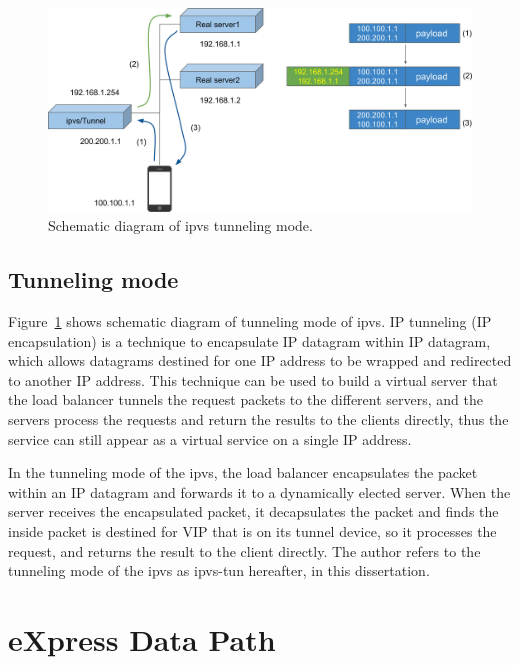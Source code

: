 \begin{figure}[h]
  \centering
  \includegraphics[width=0.9\columnwidth]{Figs/ipvs-tun-schem}

  \par\bigskip
  \centering
  \begin{minipage}{0.9\columnwidth}
    \caption[ipvs tunneling  mode]{
      Schematic diagram of ipvs tunneling mode.
    }
    \label{fig:ipvs-tun-schem}
  \end{minipage}
\end{figure}

\subsection{Tunneling mode}

Figure~\ref{fig:ipvs-tun-schem} shows schematic diagram of tunneling mode of ipvs.
IP tunneling (IP encapsulation) is a technique to encapsulate IP datagram within IP datagram, which allows datagrams destined for one IP address to be wrapped and redirected to another IP address. This technique can be used to build a virtual server that the load balancer tunnels the request packets to the different servers, and the
servers process the requests and return the results to the clients directly, thus the service can still appear as a virtual service on a single IP address.

In the tunneling mode of the ipvs, the load balancer encapsulates the packet within an IP datagram and forwards it to a dynamically elected server. 
When the server receives the encapsulated packet, it decapsulates the packet and finds the inside packet is destined for VIP that is on its tunnel device, so it processes the request, and returns the result
to the client directly.
%
The author refers to the tunneling mode of the ipvs as ipvs-tun hereafter, in this dissertation.

\FloatBarrier

\section{eXpress Data Path}

